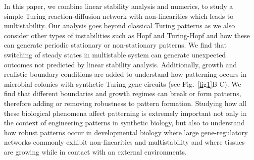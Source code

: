 In this paper, we combine linear stability analysis and numerics, to study a simple Turing reaction-diffusion network with non-linearities which leads to multistability.
Our analysis goes beyond classical Turing patterns as we also consider other types of instabilities such as Hopf and Turing-Hopf and how these can generate periodic stationary or non-stationary patterns.
We find that switching of steady states in multistable system can generate unexpected outcomes not predicted by linear stability analysis.
Additionally, growth and realistic boundary conditions are added to understand how patterning occurs in microbial colonies with synthetic Turing gene circuits (see Fig.~\ref{fig1}B-C).
We find that different boundaries and growth regimes can break or form patterns, therefore adding or removing robustness to pattern formation.
Studying how all these biological phenomena affect patterning is extremely important not only in the context of engineering patterns in synthetic biology, but also to understand how robust patterns occur in developmental biology where large gene-regulatory networks commonly exhibit non-linearities and multistability and where tissues are growing while in contact with an external environments.


